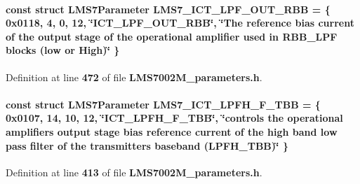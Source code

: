 \paragraph[{L\+M\+S7\+\_\+\+I\+C\+T\+\_\+\+L\+P\+F\+\_\+\+O\+U\+T\+\_\+\+R\+BB}]{\setlength{\rightskip}{0pt plus 5cm}const struct {\bf L\+M\+S7\+Parameter} L\+M\+S7\+\_\+\+I\+C\+T\+\_\+\+L\+P\+F\+\_\+\+O\+U\+T\+\_\+\+R\+BB = \{ 0x0118, 4, 0, 12, \char`\"{}\+I\+C\+T\+\_\+\+L\+P\+F\+\_\+\+O\+U\+T\+\_\+\+R\+B\+B\char`\"{}, \char`\"{}\+The reference bias current of the output stage of the operational amplifier used in R\+B\+B\+\_\+\+L\+P\+F blocks (low or High)\char`\"{} \}\hspace{0.3cm}{\ttfamily [static]}}\label{LMS7002M__parameters_8h_aa4cc04c6945c37618685003cf9139d65}


Definition at line {\bf 472} of file {\bf L\+M\+S7002\+M\+\_\+parameters.\+h}.

\paragraph[{L\+M\+S7\+\_\+\+I\+C\+T\+\_\+\+L\+P\+F\+H\+\_\+\+F\+\_\+\+T\+BB}]{\setlength{\rightskip}{0pt plus 5cm}const struct {\bf L\+M\+S7\+Parameter} L\+M\+S7\+\_\+\+I\+C\+T\+\_\+\+L\+P\+F\+H\+\_\+\+F\+\_\+\+T\+BB = \{ 0x0107, 14, 10, 12, \char`\"{}\+I\+C\+T\+\_\+\+L\+P\+F\+H\+\_\+\+F\+\_\+\+T\+B\+B\char`\"{}, \char`\"{}controls the operational amplifiers output stage bias reference current of the high band low pass filter of the transmitter\textquotesingle{}s baseband (\+L\+P\+F\+H\+\_\+\+T\+B\+B)\char`\"{} \}\hspace{0.3cm}{\ttfamily [static]}}\label{LMS7002M__parameters_8h_ade424ab561396abc92eaad72544d90b4}


Definition at line {\bf 413} of file {\bf L\+M\+S7002\+M\+\_\+parameters.\+h}.

